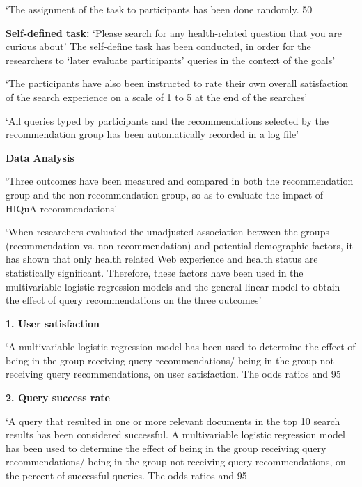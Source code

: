 \documentclass[]{article}
\begin{document}
‘The assignment of the task to participants has been done randomly. 50%

\textbf{Self-defined task:} ‘Please search for any health-related question that you are curious about’
The self-define task has been conducted, in order for the researchers to ‘later evaluate participants’ queries in the context of the goals’

‘The participants have also been instructed to rate their own overall satisfaction of the search experience on a scale of 1 to 5 at the end of the searches’

‘All queries typed by participants and the recommendations selected by the recommendation group has been automatically recorded in a log file’


\textbf{Data Analysis}

‘Three outcomes have been measured and compared in both the recommendation group and the non-recommendation group, so as to evaluate the impact of HIQuA recommendations’

‘When researchers evaluated the unadjusted association between the groups (recommendation vs. non-recommendation) and potential demographic factors, it has shown that only health related Web experience and health status are statistically significant. Therefore, these factors have been used in the multivariable logistic regression models and the general linear model to obtain the effect of query recommendations on the three outcomes’ 

\textbf{1.	User satisfaction}

‘A multivariable logistic regression model has been used to determine the effect of being in the group receiving query recommendations/ being in the group not receiving query recommendations, on user satisfaction. The odds ratios and 95%

\textbf{2.	Query success rate}

‘A query that resulted in one or more relevant documents in the top 10 search results has been considered successful. A multivariable logistic regression model has been used to determine the effect of being in the group receiving query recommendations/ being in the group not receiving query recommendations, on the percent of successful queries. The odds ratios and 95%
\end{document}
